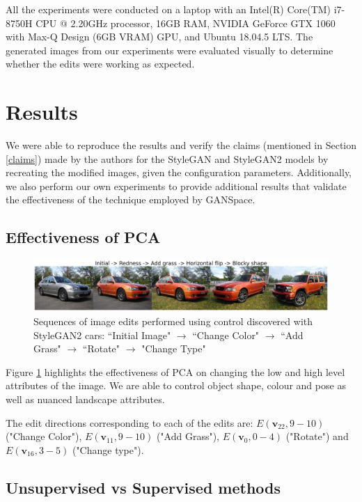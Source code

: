 All the experiments were conducted on a laptop with an Intel(R) Core(TM) i7-8750H CPU @ 2.20GHz processor, 16GB RAM, NVIDIA GeForce GTX 1060 with Max-Q Design (6GB VRAM) GPU, and Ubuntu 18.04.5 LTS. The generated images from our experiments were evaluated visually to determine whether the edits were working as expected.

\section{Results}

We were able to reproduce the results and verify the claims (mentioned in Section \ref{claims}) made by the authors for the StyleGAN and StyleGAN2 models by recreating the modified images, given the configuration parameters. Additionally, we also perform our own experiments to provide additional results that validate the effectiveness of the technique employed by GANSpace.


\subsection{Effectiveness of PCA}

\begin{figure}[H]
    \centering
    \includegraphics[width=\textwidth]{figs/figure1_StyleGAN2_cars.png}
    \caption{Sequences of image edits performed using control discovered with StyleGAN2 cars: ``Initial Image" $\rightarrow$ ``Change Color" $\rightarrow$ ``Add Grass" $\rightarrow$ ``Rotate" $\rightarrow$ "Change Type"}
    \label{fig:cars}
\end{figure}

Figure \ref{fig:cars} highlights the effectiveness of PCA on changing the low and high level attributes of the image. We are able to control object shape, colour and pose as well as nuanced landscape attributes.

The edit directions corresponding to each of the edits are: $E(\textbf{v}_{22}, 9-10)$ ("Change Color"), $E(\textbf{v}_{11}, 9-10)$ ("Add Grass"), $E(\textbf{v}_{0}, 0-4)$ ("Rotate") and $E(\textbf{v}_{16}, 3-5)$ ("Change type").

\subsection{Unsupervised vs Supervised methods}

